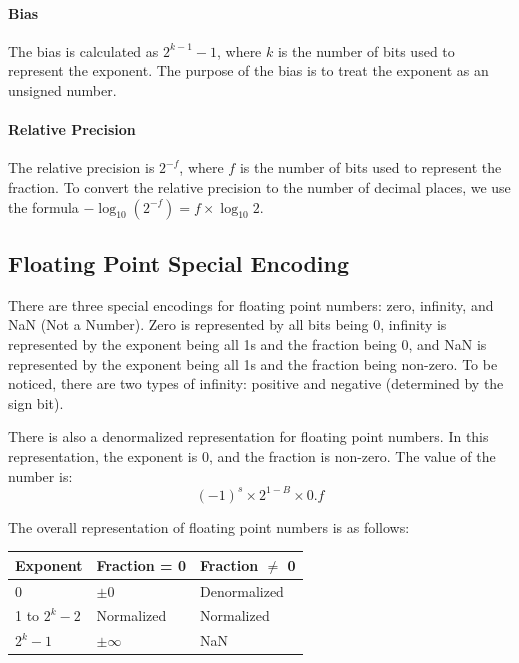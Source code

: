 \documentclass[a4paper,12pt]{article}
\begin{document}
\paragraph{Bias} The bias is calculated as $2^{k-1} - 1$, where $k$ is the number of bits used to represent the exponent. The purpose of the bias is to treat the exponent as an unsigned number.

\paragraph{Relative Precision} The relative precision is $2^{-f}$, where $f$ is the number of bits used to represent the fraction. To convert the relative precision to the number of decimal places, we use the formula $-\log_{10}(2^{-f}) = f \times \log_{10}2$.

\subsection{Floating Point Special Encoding}

There are three special encodings for floating point numbers: zero, infinity, and NaN (Not a Number). Zero is represented by all bits being 0, infinity is represented by the exponent being all 1s and the fraction being 0, and NaN is represented by the exponent being all 1s and the fraction being non-zero. To be noticed, there are two types of infinity: positive and negative (determined by the sign bit).

There is also a denormalized representation for floating point numbers. In this representation, the exponent is 0, and the fraction is non-zero. The value of the number is:
\begin{equation*}
	(-1)^s \times 2^{1 - B} \times 0.f
\end{equation*}

The overall representation of floating point numbers is as follows:
\begin{table}[H]
	\centering
	\begin{tabular}{lll}
		\toprule
		\textbf{Exponent} & \textbf{Fraction = 0} & \textbf{Fraction $\neq$ 0}\\
		\midrule
		0 & $\pm 0$ & Denormalized \\
		1 to $2^k - 2$ & Normalized & Normalized \\
		$2^k - 1$ & $\pm \infty$ & NaN \\
		\bottomrule
	\end{tabular}
\end{table}
\end{document}
